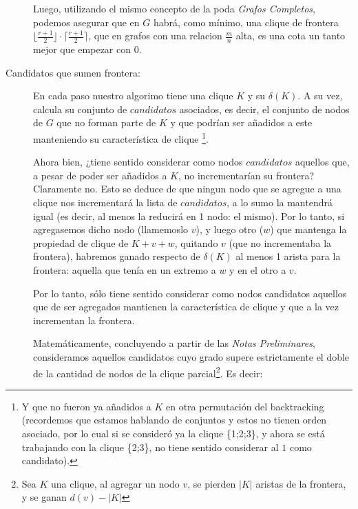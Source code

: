 \begin{description}
            \par Luego, utilizando el mismo concepto de la poda \emph{Grafos Completos}, podemos
            asegurar que en $G$ habr\'a, como m\'inimo, una clique de frontera
            $\lfloor\frac{r+1}{2}\rfloor \cdot \lceil\frac{r+1}{2}\rceil$, que en grafos con una
            relacion $\frac{m}{n}$ alta, es una cota un tanto mejor que empezar con 0.

    \item[Candidatos que sumen frontera: ] En cada paso nuestro algorimo tiene
        una clique $K$ y su $\delta(K)$. A su vez, calcula su conjunto de $candidatos$
        asociados, es decir, el conjunto de nodos de $G$ que no forman parte de $K$ y
        que podr\'ian ser a\~nadidos a este manteniendo su caracter\'istica de clique%
        \footnote{Y que no fueron ya a\~nadidos a $K$ en otra permutaci\'on del backtracking
        (recordemos que estamos hablando de conjuntos y estos no tienen orden asociado, por
        lo cual si se consider\'o ya la clique \{1;2;3\}, y ahora se est\'a trabajando con
        la clique \{2;3\}, no tiene sentido considerar al $1$ como candidato).}.

        \par Ahora bien, ¿tiene sentido considerar como nodos $candidatos$ aquellos que,
            a pesar de poder ser a\~nadidos a $K$, no incrementar\'ian su frontera? Claramente
            no. Esto se deduce de que ningun nodo que se agregue a una clique nos incrementar\'a
            la lista de $candidatos$, a lo sumo la mantendr\'a igual (es decir, al menos la reducir\'a
            en 1 nodo: el mismo). Por lo tanto, si agregasemos dicho nodo (llamemoslo $v$), y
            luego otro ($w$) que mantenga la propiedad de clique de $K+v+w$,
            quitando $v$ (que no incrementaba la frontera), habremos ganado respecto de $\delta(K)$
            al menos 1 arista para la frontera: aquella que ten\'ia en un extremo a $w$ y en
            el otro a $v$.

        \par Por lo tanto, s\'olo tiene sentido considerar como nodos candidatos aquellos que
            de ser agregados mantienen la caracter\'istica de clique y que a la vez incrementan
            la frontera.

        \par Matem\'aticamente, concluyendo a partir de las \emph{Notas Preliminares}, consideramos
            aquellos candidatos cuyo grado supere estrictamente el doble de la cantidad
            de nodos de la clique parcial\footnote{Sea $K$ una clique, al agregar un nodo $v$, se pierden
            $|K|$ aristas de la frontera, y se ganan $d(v) - |K|$}. Es decir:


\end{description}
